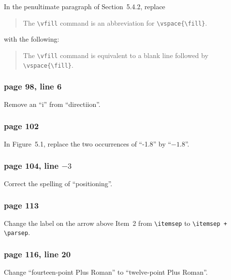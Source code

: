 In the penultimate paragraph of Section~5.4.2, replace 
\begin{quote}
The \verb|\vfill| command is an abbreviation for \verb|\vspace{\fill}|.
\end{quote}
with the following:
\begin{quote}
The \verb|\vfill| command is equivalent to a blank line followed by
\verb|\vspace{\fill}|.
\end{quote}
 
\subsubsection*{page 98, line 6}
 
Remove an ``i'' from ``directiion''. 
 
\subsubsection*{page 102}
In Figure~5.1, replace the two occurrences of ``-1.8'' by
``$-1.8$''.
 
\subsubsection*{page 104, line $-3$}
Correct the spelling of ``positioning''.
 
 
\subsubsection*{page 113}
{\sloppy Change the label on the arrow above Item~2 from \verb|\itemsep| to
\verb|\itemsep + \parsep|.\par}
 
 
\subsubsection*{page 116, line 20}
 
Change ``fourteen-point Plus Roman'' to ``twelve-point Plus Roman''.
 
